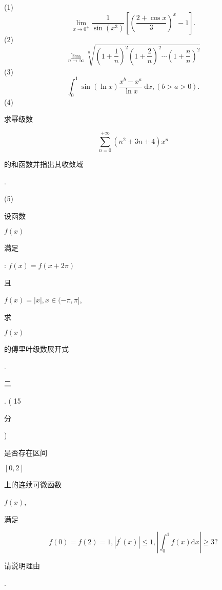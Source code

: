 \documentclass[10pt]{article}
\begin{document}
(1)
$$
\lim _{x \rightarrow 0^{+}} \frac{1}{\sin \left(x^{3}\right)}\left[\left(\frac{2+\cos x}{3}\right)^{x}-1\right] .
$$
(2)
$$
\lim _{n \rightarrow \infty} \sqrt[n]{\left(1+\frac{1}{n}\right)^{2}\left(1+\frac{2}{n}\right)^{2} \cdots\left(1+\frac{n}{n}\right)^{2}}
$$
(3)
$$
\int_{0}^{1} \sin (\ln x) \frac{x^{b}-x^{a}}{\ln x} \mathrm{~d} x,(b>a>0) .
$$
(4) \begin{CJK}{UTF8}{mj}求幂级数\end{CJK}
$$
\sum_{n=0}^{+\infty}\left(n^{2}+3 n+4\right) x^{n}
$$
\begin{CJK}{UTF8}{mj}的和函数并指出其收敛域\end{CJK}.

(5) \begin{CJK}{UTF8}{mj}设函数\end{CJK} $f(x)$ \begin{CJK}{UTF8}{mj}满足\end{CJK}: $f(x)=f(x+2 \pi)$ \begin{CJK}{UTF8}{mj}且\end{CJK} $f(x)=|x|, x \in(-\pi, \pi]$, \begin{CJK}{UTF8}{mj}求\end{CJK} $f(x)$ \begin{CJK}{UTF8}{mj}的傅里叶级数展开式\end{CJK}.

\begin{CJK}{UTF8}{mj}二\end{CJK}. ( 15 \begin{CJK}{UTF8}{mj}分\end{CJK}) \begin{CJK}{UTF8}{mj}是否存在区间\end{CJK} $[0,2]$ \begin{CJK}{UTF8}{mj}上的连续可微函数\end{CJK} $f(x)$, \begin{CJK}{UTF8}{mj}满足\end{CJK}
$$
f(0)=f(2)=1,\left|f^{\prime}(x)\right| \leqslant 1,\left|\int_{0}^{1} f(x) \mathrm{d} x\right| \geqslant 3 ?
$$
\begin{CJK}{UTF8}{mj}请说明理由\end{CJK}.
\end{document}
